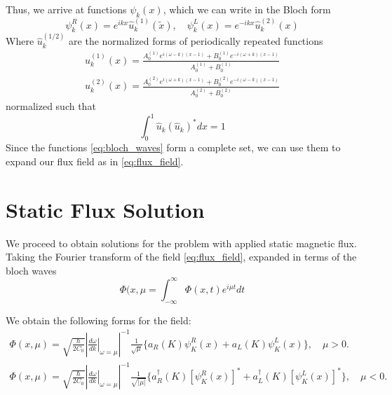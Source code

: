 %
Thus, we arrive at functions $\psi_{k}(x)$, which we can write in the Bloch form
\begin{equation}\label{eq:bloch_waves}
    \psi_{k}^R (x) =e^{ikx} \hat{u}_{k}^{(1)}(\tilde{x}), \hspace{12pt}  \psi_{k}^L(x) =e^{-ikx} \hat{u}_{k}^{(2)}(x) 
\end{equation}
%
Where $\hat{u}_{k}^{(1/2)}$ are the normalized forms of periodically repeated functions
\begin{gather}
      u_{k}^{(1)}(x) = 
      \frac{A_0^{(1)} e^{i(\omega-k)(x-1)} + B_0^{(1)} e^{-i(\omega+k)(x-1)}}{A_0^{(1)}+B_0^{(1)}}\\
       u_{k}^{(2)}(x) =
      \frac{A_0^{(2)} e^{i(\omega+k)(x-1)} + B_0^{(2)} e^{-i(\omega-k)(x-1)}}{A_0^{(2)}+B_0^{(2)}}
\end{gather}
%
normalized such that
\begin{equation}
\int_0^1 \hat{u}_{k} (\hat{u}_{k})^* dx = 1
\end{equation}
%
Since the functions \ref{eq:bloch_waves} form a complete set, we can use them to expand our flux field as in \ref{eq:flux_field}.
%
\section{Static Flux Solution}\label{eq:Static_Flux}

We proceed to obtain solutions for the problem with applied static magnetic flux. Taking the Fourier transform of the field \ref{eq:flux_field}, expanded in terms of the bloch waves
\begin{equation}
    \Phi(x, \mu = \int_{-\infty}^\infty \Phi(x,t) e^{i\mu t} dt
\end{equation}

We obtain the following forms for the field:
\begin{gather}
    \Phi(x,\mu) = \sqrt{\frac{\hbar}{2 C_0}} \left| \left.\frac{d\omega}{dk}\right|_{\omega=\mu}\right|^{-1}\frac{1}{\sqrt{\mu}}\biggl\lbrace a_R(K) \psi^R_K(x) + a_L(K)\psi_K^L(x)\biggr\rbrace, \hspace{12pt} \mu > 0.\\
    \Phi(x,\mu) = \sqrt{\frac{\hbar}{2 C_0}} \left| \left.\frac{d\omega}{dk}\right|_{\omega=\mu}\right|^{-1}\frac{1}{\sqrt{|\mu|}}\biggl\lbrace a_R^\dagger(K) \left[\psi^R_K(x)\right]^* + a_L^\dagger(K)\left[\psi_K^L(x)\right]^*\biggr\rbrace, \hspace{12pt} \mu < 0.
\end{gather}

